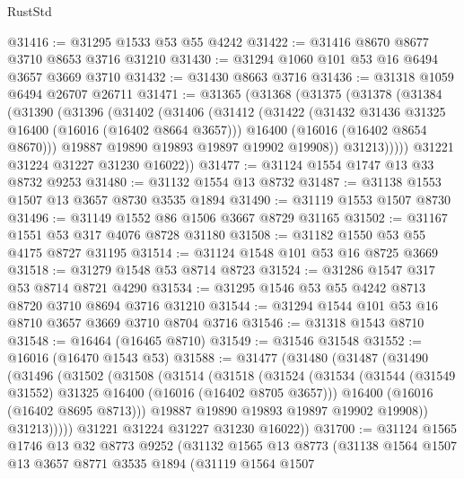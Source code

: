 \begin{lexlean}{RustStd}
\begin{coremodule}
@31416 := @31295 @1533 @53 @55 @4242
@31422 := @31416 @8670 @8677 @3710 @8653 @3716 @31210
@31430 := @31294 @1060 @101 @53 @16 @6494 @3657 @3669 @3710
@31432 := @31430 @8663 @3716
@31436 := @31318 @1059 @6494 @26707 @26711
@31471 := @31365
    (@31368
      (@31375
        (@31378
          (@31384
            (@31390
              (@31396
                (@31402
                  (@31406
                    (@31412
                      (@31422
                        (@31432 @31436 @31325 @16400 (@16016 (@16402 @8664 @3657)))
                        @16400
                        (@16016 (@16402 @8654 @8670)))
                      @19887
                      @19890
                      @19893
                      @19897
                      @19902
                      @19908))
                  @31213)))))
        @31221
        @31224
        @31227
        @31230
        @16022))
@31477 := @31124 @1554 @1747 @13 @33 @8732 @9253
@31480 := @31132 @1554 @13 @8732
@31487 := @31138 @1553 @1507 @13 @3657 @8730 @3535 @1894
@31490 := @31119 @1553 @1507 @8730
@31496 := @31149 @1552 @86 @1506 @3667 @8729 @31165
@31502 := @31167 @1551 @53 @317 @4076 @8728 @31180
@31508 := @31182 @1550 @53 @55 @4175 @8727 @31195
@31514 := @31124 @1548 @101 @53 @16 @8725 @3669
@31518 := @31279 @1548 @53 @8714 @8723
@31524 := @31286 @1547 @317 @53 @8714 @8721 @4290
@31534 := @31295 @1546 @53 @55 @4242 @8713 @8720 @3710 @8694 @3716 @31210
@31544 := @31294 @1544 @101 @53 @16 @8710 @3657 @3669 @3710 @8704 @3716
@31546 := @31318 @1543 @8710
@31548 := @16464 (@16465 @8710)
@31549 := @31546 @31548
@31552 := @16016 (@16470 @1543 @53)
@31588 := @31477
    (@31480
      (@31487
        (@31490
          (@31496
            (@31502
              (@31508
                (@31514
                  (@31518
                    (@31524
                      (@31534
                        (@31544 (@31549 @31552) @31325 @16400 (@16016 (@16402 @8705 @3657)))
                        @16400
                        (@16016 (@16402 @8695 @8713)))
                      @19887
                      @19890
                      @19893
                      @19897
                      @19902
                      @19908))
                  @31213)))))
        @31221
        @31224
        @31227
        @31230
        @16022))
@31700 := @31124
    @1565
    @1746
    @13
    @32
    @8773
    @9252
    (@31132
      @1565
      @13
      @8773
      (@31138
        @1564
        @1507
        @13
        @3657
        @8771
        @3535
        @1894
        (@31119
          @1564
          @1507

\end{coremodule}
\end{lexlean}
